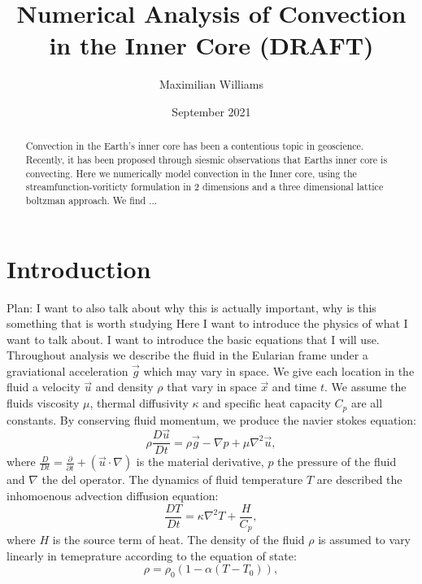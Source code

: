 \documentclass{article}
\title{Numerical Analysis of Convection in the Inner Core (DRAFT)}
\author{Maximilian Williams}
\date{September 2021}
\begin{document}
\maketitle

\begin{abstract}
	Convection in the Earth's inner core has been a contentious topic in geoscience. Recently, it has been proposed through siesmic observations that Earths inner core is convecting. Here we numerically model convection in the Inner core, using the streamfunction-voriticty formulation in 2 dimensions and a three dimensional lattice boltzman approach. We find ...
	
 
\end{abstract}


\section*{Introduction}
Plan:
I want to also talk about why this is actually important, why is this something that is worth studying
\newline
Here I want to introduce the physics of what I want to talk about. I want to introduce 
the basic equations that I will use.
\newline
\noindent Throughout analysis we describe the fluid in the Eularian frame under a graviational acceleration $\vec{g}$ which may vary in space. We give each location in the fluid a velocity $\vec{u}$ and density $\rho$ that vary in space $\vec{x}$ and time $t$. We assume the fluids viscosity $\mu$, thermal diffusivity $\kappa$ and specific heat capacity $C_p$ are all constants. By conserving fluid momentum, we produce the navier stokes equation:
\begin{equation}
	\rho \frac{D \vec{u}}{D t} = \rho \vec{g} - \nabla p + \mu \nabla^2 \vec{u},
	\label{NSE}
\end{equation}
where $\frac{D}{D t} = \frac{\partial }{\partial t} + (\vec{u} \cdot \nabla)$ is the material derivative, $p$ the pressure of the fluid and $\nabla$ the del operator. The dynamics of fluid temperature $T$ are described the inhomoenous advection diffusion equation:
\begin{equation}
	\frac{D T}{D t} = \kappa \nabla^2 T + \frac{H}{C_p},
	\label{adeT}
\end{equation}
where $H$ is the source term of heat. The density of the fluid $\rho$ is assumed to vary linearly in temeprature according to the equation of state:
\begin{equation}
	\rho = \rho_0 (1- \alpha(T -T_0)),
	\label{equation of state}
\end{equation}
\end{document}
